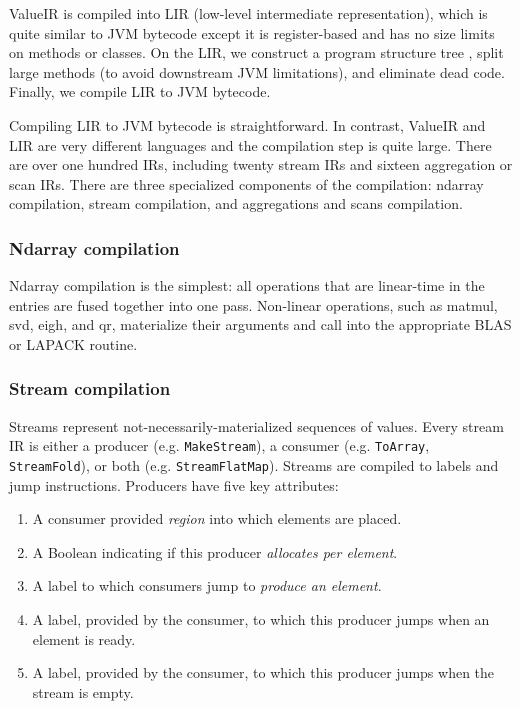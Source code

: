 \documentclass[sigconf, nonacm]{acmart}
\begin{document}
ValueIR is compiled into LIR (low-level intermediate representation), which is quite similar to JVM
bytecode except it is register-based and has no size limits on methods or classes. On the LIR, we
construct a program structure tree \cite{pst}, split large methods (to avoid downstream JVM
limitations), and eliminate dead code. Finally, we compile LIR to JVM bytecode.

Compiling LIR to JVM bytecode is straightforward. In contrast, ValueIR and LIR are very different
languages and the compilation step is quite large. There are over one hundred IRs, including twenty
stream IRs and sixteen aggregation or scan IRs. There are three specialized components of the
compilation: ndarray compilation, stream compilation, and aggregations and scans compilation.

\subsubsection{Ndarray compilation}

Ndarray compilation is the simplest: all operations that are linear-time in the entries are fused
together into one pass. Non-linear operations, such as matmul, svd, eigh, and qr, materialize their
arguments and call into the appropriate BLAS or LAPACK routine.

\subsubsection{Stream compilation}

Streams represent not-necessarily-materialized sequences of values. Every stream IR is either a
producer (e.g. \texttt{MakeStream}), a consumer (e.g. \texttt{ToArray}, \texttt{StreamFold}), or
both (e.g. \texttt{StreamFlatMap}). Streams are compiled to labels and jump instructions. Producers
have five key attributes:

\begin{enumerate}
\item A consumer provided \emph{region} into which elements are placed.
\item A Boolean indicating if this producer \emph{allocates per element}.
\item A label to which consumers jump to \emph{produce an element}.
\item A label, provided by the consumer, to which this producer jumps when an element is ready.
\item A label, provided by the consumer, to which this producer jumps when the stream is empty.
\end{enumerate}
\end{document}
